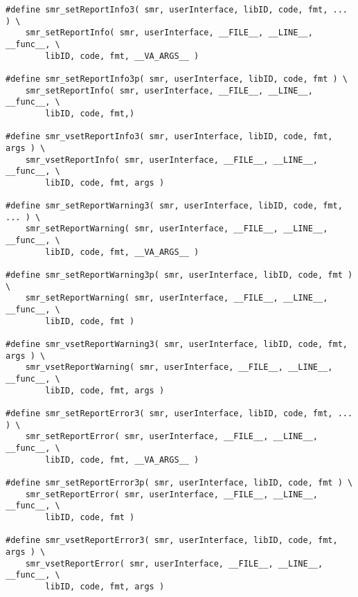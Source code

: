 \documentclass[11pt]{article}
\begin{document}
\begin{verbatim}
#define smr_setReportInfo3( smr, userInterface, libID, code, fmt, ... ) \
    smr_setReportInfo( smr, userInterface, __FILE__, __LINE__, __func__, \
        libID, code, fmt, __VA_ARGS__ )

#define smr_setReportInfo3p( smr, userInterface, libID, code, fmt ) \
    smr_setReportInfo( smr, userInterface, __FILE__, __LINE__, __func__, \
        libID, code, fmt,)

#define smr_vsetReportInfo3( smr, userInterface, libID, code, fmt, args ) \
    smr_vsetReportInfo( smr, userInterface, __FILE__, __LINE__, __func__, \
        libID, code, fmt, args )

#define smr_setReportWarning3( smr, userInterface, libID, code, fmt, ... ) \
    smr_setReportWarning( smr, userInterface, __FILE__, __LINE__, __func__, \
        libID, code, fmt, __VA_ARGS__ )

#define smr_setReportWarning3p( smr, userInterface, libID, code, fmt ) \
    smr_setReportWarning( smr, userInterface, __FILE__, __LINE__, __func__, \
        libID, code, fmt )

#define smr_vsetReportWarning3( smr, userInterface, libID, code, fmt, args ) \
    smr_vsetReportWarning( smr, userInterface, __FILE__, __LINE__, __func__, \
        libID, code, fmt, args )

#define smr_setReportError3( smr, userInterface, libID, code, fmt, ... ) \
    smr_setReportError( smr, userInterface, __FILE__, __LINE__, __func__, \
        libID, code, fmt, __VA_ARGS__ )

#define smr_setReportError3p( smr, userInterface, libID, code, fmt ) \
    smr_setReportError( smr, userInterface, __FILE__, __LINE__, __func__, \
        libID, code, fmt )

#define smr_vsetReportError3( smr, userInterface, libID, code, fmt, args ) \
    smr_vsetReportError( smr, userInterface, __FILE__, __LINE__, __func__, \
        libID, code, fmt, args )

\end{verbatim}
\end{document}
